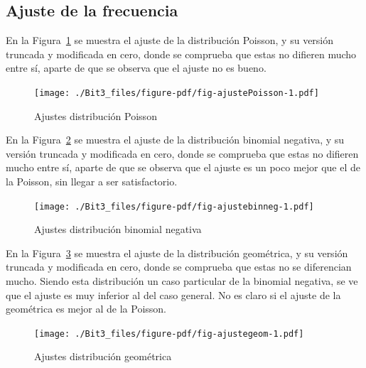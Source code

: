 \documentclass[
  letterpaper,
  onepage,
  openany]{scrreprt}
\begin{document}
\hypertarget{ajuste-de-la-frecuencia}{%
\subsection{Ajuste de la frecuencia}\label{ajuste-de-la-frecuencia}}

En la Figura~\ref{fig-ajustePoisson} se muestra el ajuste de la
distribución Poisson, y su versión truncada y modificada en cero, donde
se comprueba que estas no difieren mucho entre sí, aparte de que se
observa que el ajuste no es bueno.

\begin{figure}[H]

\caption{\label{fig-ajustePoisson}Ajustes distribución Poisson}

{\centering \texttt{[image: ./Bit3\_files/figure-pdf/fig-ajustePoisson-1.pdf]}

}

\end{figure}

En la Figura~\ref{fig-ajustebinneg} se muestra el ajuste de la
distribución binomial negativa, y su versión truncada y modificada en
cero, donde se comprueba que estas no difieren mucho entre sí, aparte de
que se observa que el ajuste es un poco mejor que el de la Poisson, sin
llegar a ser satisfactorio.

\begin{figure}[H]

\caption{\label{fig-ajustebinneg}Ajustes distribución binomial negativa}

{\centering \texttt{[image: ./Bit3\_files/figure-pdf/fig-ajustebinneg-1.pdf]}

}

\end{figure}

En la Figura~\ref{fig-ajustegeom} se muestra el ajuste de la
distribución geométrica, y su versión truncada y modificada en cero,
donde se comprueba que estas no se diferencian mucho. Siendo esta
distribución un caso particular de la binomial negativa, se ve que el
ajuste es muy inferior al del caso general. No es claro si el ajuste de
la geométrica es mejor al de la Poisson.

\begin{figure}[H]

\caption{\label{fig-ajustegeom}Ajustes distribución geométrica}

{\centering \texttt{[image: ./Bit3\_files/figure-pdf/fig-ajustegeom-1.pdf]}

}

\end{figure}
\end{document}

